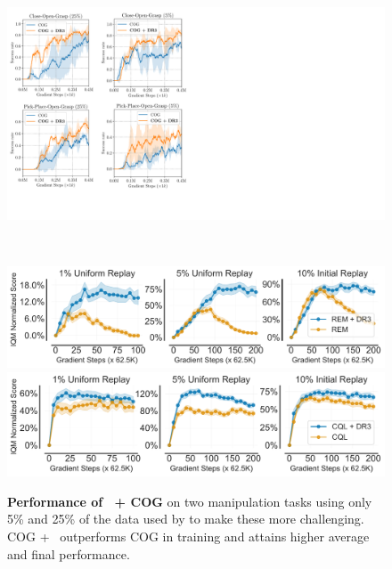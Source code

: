 \begin{figure}[t]
\centering
\begin{minipage}{.4\textwidth}
\includegraphics[width=0.96\linewidth]{figures/cog_plots.pdf}
\vspace{-0.2cm}
\caption{\footnotesize{\textbf{Performance of \methodname\ + COG} on two manipulation tasks using only 5\% and 25\% of the data used by \citet{singh2020cog} to make these more challenging.
COG + \methodname\  outperforms COG in training and attains higher average and final performance.}}
\label{fig:cog_figure}
\end{minipage}~~\vline~~
\begin{minipage}{.56\textwidth}
    \centering
    \includegraphics[width=0.99\linewidth]{figures/atari_new/IQM_rem_penalty.pdf}
    \includegraphics[width=0.99\linewidth]{figures/atari_new/IQM_cql_penalty.pdf}

\end{minipage}
\end{figure}
